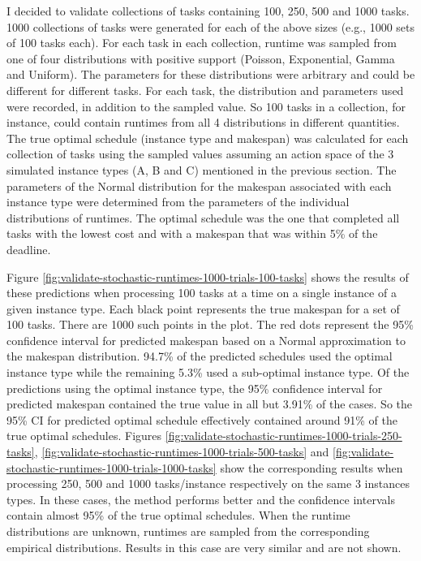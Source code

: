 \documentclass[12pt]{report}
\begin{document}
I decided to validate collections of tasks containing 100, 250, 500 and 1000 tasks. 
1000 collections of tasks were generated for each of the above sizes (e.g., 1000 sets of 100 tasks each).
For each task in each collection, runtime was sampled from one of four distributions with positive support (Poisson, Exponential, Gamma and Uniform).
The parameters for these distributions were arbitrary and could be different for different tasks.
For each task, the distribution and parameters used were recorded, in addition to the sampled value.
So 100 tasks in a collection, for instance, could contain runtimes from all 4 distributions in different quantities.
The true optimal schedule (instance type and makespan) was calculated for each collection of tasks using the sampled values assuming an action space of the 3 simulated instance types (A, B and C) mentioned in the previous section.
The parameters of the Normal distribution for the makespan associated with each instance type were determined from the parameters of the individual distributions of runtimes.
The optimal schedule was the one that completed all tasks with the lowest cost and with a makespan that was within 5\% of the deadline.

Figure \ref{fig:validate-stochastic-runtimes-1000-trials-100-tasks} shows the results of these predictions when processing 100 tasks at a time on a single instance of a given instance type.
Each black point represents the true makespan for a set of 100 tasks.
There are 1000 such points in the plot.
The red dots represent the 95\% confidence interval for predicted makespan based on a Normal approximation to the makespan distribution.
94.7\% of the predicted schedules used the optimal instance type while the remaining 5.3\% used a sub-optimal instance type.
Of the predictions using the optimal instance type, the 95\% confidence interval for predicted makespan contained the true value in all but 3.91\% of the cases.
So the 95\% CI for predicted optimal schedule effectively contained around 91\% of the true optimal schedules.
Figures \ref{fig:validate-stochastic-runtimes-1000-trials-250-tasks}, \ref{fig:validate-stochastic-runtimes-1000-trials-500-tasks} and \ref{fig:validate-stochastic-runtimes-1000-trials-1000-tasks} show the corresponding results when processing 250, 500 and 1000 tasks/instance respectively on the same 3 instances types. 
In these cases, the method performs better and the confidence intervals contain almost 95\% of the true optimal schedules.
When the runtime distributions are unknown, runtimes are sampled from the corresponding empirical distributions. 
Results in this case are very similar and are not shown.
\end{document}
